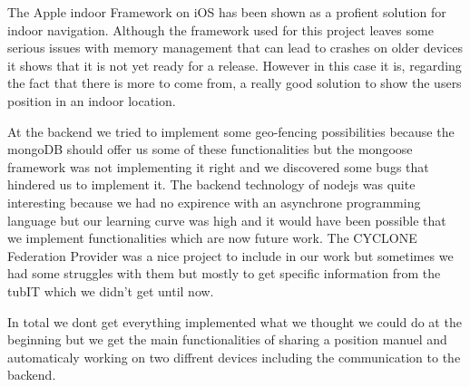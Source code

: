 The Apple indoor Framework on iOS has been shown as a profient solution for indoor navigation. Although the framework used for this project leaves some serious issues with memory management that can lead to crashes on older devices it shows that it is not yet ready for a release. However in this case it is, regarding the fact that there is more to come from, a really good solution to show the users position in an indoor location.









At the backend we tried to implement some geo-fencing possibilities because the mongoDB should offer us some of these functionalities but the mongoose framework was not implementing it right and we discovered some bugs that hindered us to implement it. The backend technology of nodejs was quite interesting because we had no expirence with an asynchrone programming language but our learning curve was high and it would have been possible that we implement functionalities which are now future work. The CYCLONE Federation Provider was a nice project to include in our work but sometimes we had some struggles with them but mostly to get specific information from the tubIT which we didn't get until now.

In total we dont get everything implemented what we thought we could do at the beginning but we get the main functionalities of sharing a position manuel and automaticaly working on two diffrent devices including the communication to the backend.

